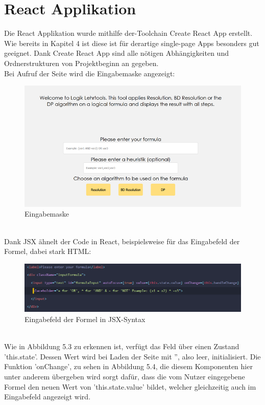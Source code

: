 \section{React Applikation}
Die React Applikation wurde mithilfe der-Toolchain Create React App erstellt. Wie bereits in Kapitel 4 ist diese ist für derartige single-page Apps besonders gut geeignet. Dank Create React App sind alle nötigen Abhängigkeiten und Ordnerstrukturen von Projektbeginn an gegeben. \\
Bei Aufruf der Seite wird die Eingabemaske angezeigt:\\
\begin{figure}[htb]
     \centerline{\includegraphics{../Abbildungen/eingabe.png}}
  \caption{Eingabemaske}
  \label{fig1_1}
\end{figure}\\
Dank JSX ähnelt der Code in React, beispielsweise für das Eingabefeld der Formel, dabei stark HTML:\\
\begin{figure}[htb]
     \centerline{\includegraphics[width=14cm]{../Abbildungen/formulaInput.png}}
  \caption{Eingabefeld der Formel in JSX-Syntax}
  \label{fig1_1}
\end{figure}\\
Wie in Abbildung 5.3 zu erkennen ist, verfügt das Feld über einen Zustand 'this.state'. Dessen Wert wird bei Laden der Seite mit '', also leer, initialisiert. Die Funktion 'onChange', zu sehen in Abbildung 5.4, die diesem Komponenten hier unter anderem übergeben wird sorgt dafür, dass die vom Nutzer eingegebene Formel den neuen Wert von 'this.state.value' bildet, welcher gleichzeitig auch im Eingabefeld angezeigt wird.\\

